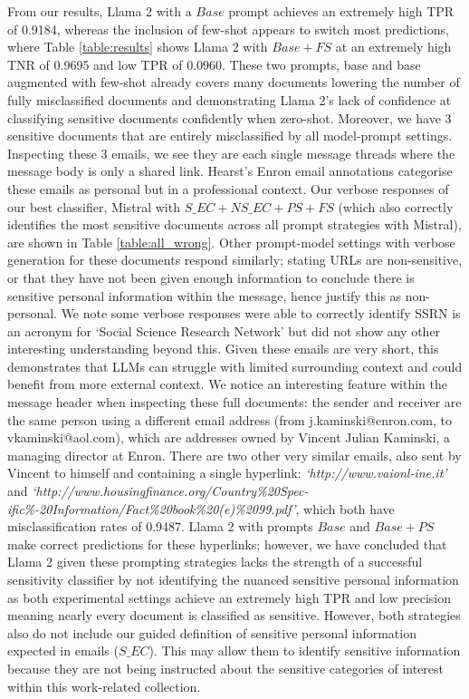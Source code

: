 From our results, Llama 2 with a $Base$ prompt achieves an extremely high TPR of 0.9184, whereas the inclusion of few-shot appears to switch most predictions, where Table \ref{table:results} shows Llama 2 with $Base+FS$ at an extremely high TNR of 0.9695 and low TPR of 0.0960. These two prompts, base and base augmented with few-shot already covers many documents lowering the number of fully misclassified documents and demonstrating Llama 2’s lack of confidence at classifying sensitive documents confidently when zero-shot. Moreover, we have 3 sensitive documents that are entirely misclassified by all model-prompt settings. Inspecting these 3 emails, we see they are each single message threads where the message body is only a shared link. Hearst’s Enron email annotations categorise these emails as personal but in a professional context. Our verbose responses of our best classifier, Mistral with $S\_EC+NS\_EC+PS+FS$ (which also correctly identifies the most sensitive documents across all prompt strategies with Mistral), are shown in Table \ref{table:all_wrong}. Other prompt-model settings with verbose generation for these documents respond similarly; stating URLs are non-sensitive, or that they have not been given enough information to conclude there is sensitive personal information within the message, hence justify this as non-personal. We note some verbose responses were able to correctly identify SSRN is an acronym for ‘Social Science Research Network’ but did not show any other interesting understanding beyond this. Given these emails are very short, this demonstrates that LLMs can struggle with limited surrounding context and could benefit from more external context. We notice an interesting feature within the message header when inspecting these full documents: the sender and receiver are the same person using a different email address (from j.kaminski@enron.com, to vkaminski@aol.com), which are addresses owned by Vincent Julian Kaminski, a managing director at Enron. There are two other very similar emails, also sent by Vincent to himself and containing a single hyperlink: \textit{`http://www.vaionl-ine.it'} and \textit{`http://www.housingfinance.org/Country\%20Spec-ific\%-20Information/Fact\%20book\%20(e)\%2099.pdf'}, which both have misclassification rates of 0.9487. Llama 2 with prompts $Base$ and $Base+PS$ make correct predictions for these hyperlinks; however, we have concluded that Llama 2 given these prompting strategies lacks the strength of a successful sensitivity classifier by not identifying the nuanced sensitive personal information as both experimental settings achieve an extremely high TPR and low precision meaning nearly every document is classified as sensitive. However, both strategies also do not include our guided definition of sensitive personal information expected in emails ($S\_EC$). This may allow them to identify sensitive information because they are not being instructed about the sensitive categories of interest within this work-related collection.

